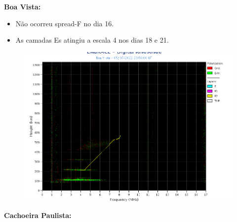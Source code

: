 \documentclass[a4paper, 10pt]{article}
\begin{document}
\textbf{Boa Vista: }

 \begin{itemize}
\item Não ocorreu spread-F no dia 16.
\item As camadas Es atingiu a escala 4 nos dias 18 e 21.
\end{itemize}
\begin{figure}[H]
    
                        \centering
   
                             \includegraphics[width=14cm]{./figures//BoaVista.png}

                        \end{figure}

                     
\textbf{Cachoeira Paulista:}
\end{document}
